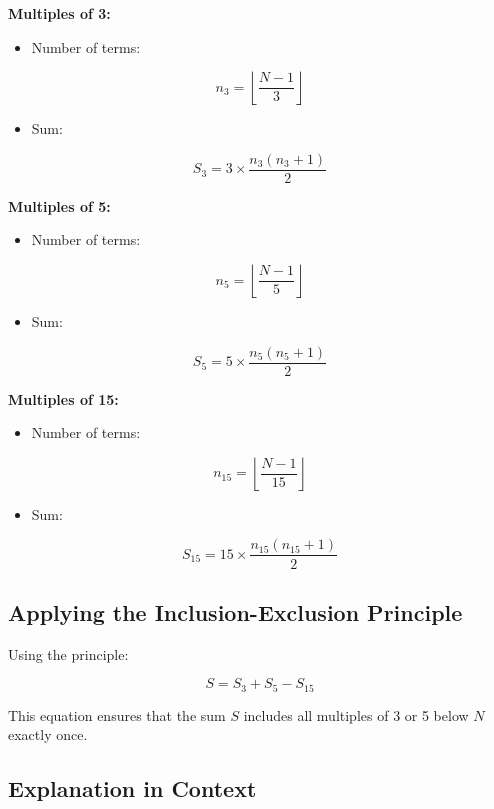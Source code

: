 \documentclass{article}
\begin{document}
\textbf{Multiples of 3:}

\begin{itemize}
    \item Number of terms:
\end{itemize}

\[
n_3 = \left\lfloor \frac{N - 1}{3} \right\rfloor
\]

\begin{itemize}
    \item Sum:
\end{itemize}

\[
S_3 = 3 \times \frac{n_3 (n_3 + 1)}{2}
\]

\textbf{Multiples of 5:}

\begin{itemize}
    \item Number of terms:
\end{itemize}

\[
n_5 = \left\lfloor \frac{N - 1}{5} \right\rfloor
\]

\begin{itemize}
    \item Sum:
\end{itemize}

\[
S_5 = 5 \times \frac{n_5 (n_5 + 1)}{2}
\]

\textbf{Multiples of 15:}

\begin{itemize}
    \item Number of terms:
\end{itemize}

\[
n_{15} = \left\lfloor \frac{N - 1}{15} \right\rfloor
\]

\begin{itemize}
    \item Sum:
\end{itemize}

\[
S_{15} = 15 \times \frac{n_{15} (n_{15} + 1)}{2}
\]

\subsection*{Applying the Inclusion-Exclusion Principle}

Using the principle:

\[
S = S_3 + S_5 - S_{15}
\]

This equation ensures that the sum \( S \) includes all multiples of 3 or 5 below \( N \) exactly once.

\subsection*{Explanation in Context}
\end{document}
